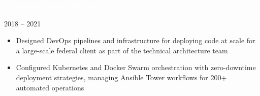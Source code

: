 \documentclass[10pt,letterpaper]{article}
\newcommand{\companyBlock}[3]{%
    \vspace{4pt}
    \noindent\colorbox{#3}{\textcolor{white}{\scriptsize\textbf{\hspace{3pt}#1\hspace{3pt}}}}
    \vspace{2pt}
}
\begin{document}
{\begin{minipage}[t][8.6in][t]{\paperwidth}
\begin{minipage}[t]{4in}
\companyBlock{Accenture Federal Services}{2018 – 2021}{company3}

\noindent{\small\textbf{\textcolor{darktext}{DevOps Engineer}}} \hfill {\scriptsize\textcolor{mediumtext}{2018 – 2021}}
\begin{itemize}
\renewcommand{\labelitemi}{\textcolor{company3}{\rule{4pt}{4pt}}}
    \item{\scriptsize\textcolor{darktext}{Designed DevOps pipelines and infrastructure for deploying code at scale for a large-scale federal client as part of the technical architecture team}}
    \item{\scriptsize\textcolor{darktext}{Configured Kubernetes and Docker Swarm orchestration with zero-downtime deployment strategies, managing Ansible Tower workflows for 200+ automated operations}}
\end{itemize}
\vspace{4pt}

\end{minipage}
\end{minipage}%
}
\end{document}
